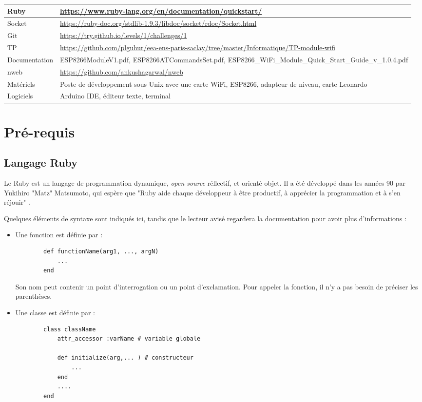 \documentclass[abstracton]{scrartcl}
\begin{document}
\begin{center}
\begin{tabulary}{\textwidth} {| J| J |}
 \hline
Ruby & \url{https://www.ruby-lang.org/en/documentation/quickstart/} \\
\hline
Socket & \url{https://ruby-doc.org/stdlib-1.9.3/libdoc/socket/rdoc/Socket.html} \\
\hline
Git & \url{https://try.github.io/levels/1/challenges/1} \\
\hline
TP & \url{https://github.com/plguhur/eea-ens-paris-saclay/tree/master/Informatique/TP-module-wifi} \\
\hline
Documentation & ESP8266ModuleV1.pdf, ESP8266ATCommandsSet.pdf, ESP8266\_WiFi\_Module\_Quick\_Start\_Guide\_v\_1.0.4.pdf \\
\hline
nweb & \url{https://github.com/ankushagarwal/nweb} \\
\hline
Matériels & Poste de développement sous Unix avec une carte WiFi, ESP8266, adapteur de niveau, carte Leonardo \\
\hline
Logiciels & Arduino IDE, éditeur texte, terminal \\
\hline
\end{tabulary}
\end{center}


\section{Pré-requis}

\subsection{Langage Ruby}

Le Ruby est un langage de programmation dynamique, \emph{open source} réflectif, et orienté objet. Il a été développé dans les années 90 par Yukihiro "Matz" Matsumoto, qui espère que "Ruby aide chaque développeur à être productif, à apprécier la programmation et à s'en réjouir" \cite{matz}.

Quelques éléments de syntaxe sont indiqués ici, tandis que le lecteur avisé regardera la documentation \cite{docRuby} pour avoir plus d'informations :

\begin{itemize}
    \item Une fonction est définie par :
    \begin{lstlisting}
        def functionName(arg1, ..., argN)
            ...
        end
    \end{lstlisting}
    Son nom peut contenir un point d'interrogation ou un point d'exclamation. Pour appeler la fonction, il n'y a pas besoin de préciser les parenthèses.
    \item Une classe est définie par :
    \begin{lstlisting}
        class className
            attr_accessor :varName # variable globale

            def initialize(arg,... ) # constructeur
                ...
            end
            ....
        end
    \end{lstlisting}
\end{itemize}
\end{document}
